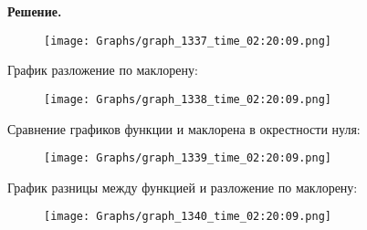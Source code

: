 \documentclass[12pt,a4paper]{extreport}
\theoremstyle{plain}
\theoremstyle{definition}
\newenvironment{solution}%
{\par\noindent\textbf{Решение. }}%
{\bigskip}
\begin{document}
\begin{solution}
\begin{figure}[H]
\centering
\texttt{[image: Graphs/graph\_1337\_time\_02:20:09.png]}
\end{figure}
График разложение по маклорену:

\begin{figure}[H]
\centering
\texttt{[image: Graphs/graph\_1338\_time\_02:20:09.png]}
\end{figure}
Сравнение графиков функции и маклорена в окрестности нуля:

\begin{figure}[H]
\centering
\texttt{[image: Graphs/graph\_1339\_time\_02:20:09.png]}
\end{figure}
График разницы между функцией и разложение по маклорену:

\begin{figure}[H]
\centering
\texttt{[image: Graphs/graph\_1340\_time\_02:20:09.png]}
\end{figure}
\end{solution}
\end{document}
